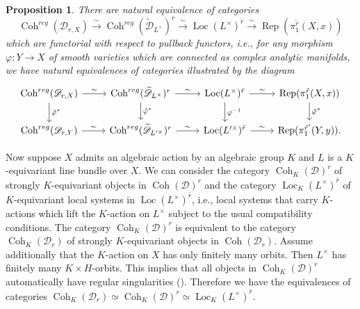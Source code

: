 \documentclass[12pt]{amsart}
\newcommand{\wt}{\widetilde}
\newcommand{\loc}{\operatorname{Loc}}
\newcommand{\coh}{\operatorname{Coh}}
\newtheorem{Prop}[Thm]{Proposition}
\theoremstyle{definition}
\numberwithin{equation}{section}
\begin{document}
\begin{Prop}\label{Prop:regular_local_systems}
	There are natural equivalence of categories \[ \coh^{reg}(\mathscr{D}_{r,X}) \xrightarrow{\sim} \coh^{reg}(\wt{\mathscr{D}}_{L^\times})^{r}  \xrightarrow{\sim} \loc(L^\times)^{\bar{r}}  \xrightarrow{\sim} \operatorname{Rep}(\pi^{\tilde{r}}_1(X, x)) \]
	which are functorial with respect to pullback functors, i.e., for any morphism $\varphi: Y \to X$ of smooth varieties which are connected as  complex analytic manifolds, we have natural equivalences of categories illustrated by the diagram
	\begin{equation}\label{diag:pi_functors}
		\begin{tikzcd}
			\coh^{reg}(\mathscr{D}_{r,X}) \arrow[r, "\sim"] \arrow[d, "\tilde{\varphi}^*"] & \coh^{reg}(\wt{\mathscr{D}}_{L^\times})^{r} \arrow[r, "\sim"] \arrow[d, "\tilde{\varphi}^*"]   & \loc(L^\times)^{\bar{r}}  \arrow[r, "\sim"]  \arrow[d, "\varphi^{-1}"]  & \operatorname{Rep}(\pi^{\tilde{r}}_1(X, x)) \arrow[d, "\tilde{\varphi}^*"] \\	
			\coh^{reg}(\mathscr{D}_{r,Y}) \arrow[r, "\sim"]   & \coh^{reg}(\wt{\mathscr{D}}_{L'^\times})^{r} \arrow[r, "\sim"]    & \loc(L'^\times)^{\bar{r}}  \arrow[r, "\sim"]   & \operatorname{Rep}(\pi^{\tilde{r}'}_1(Y, y)). 			
		\end{tikzcd}	
	\end{equation}
\end{Prop}

Now suppose $X$ admits an algebraic action by an algebraic group $K$ and $L$ is a $K$-equivariant line bundle over $X$. We can consider the category $\coh_K(\mathscr{D})^r$ of strongly $K$-equivariant objects in $\coh(\mathscr{D})^r$ and the category $\loc_{K}(L^\times)^{\bar{r}}$ of $K$-equivariant local systems in $\loc(L^\times)^{\bar{r}}$, i.e., local systems that carry $K$-actions which lift the $K$-action on $L^\times$
subject to the usual compatibility conditions. The category $\coh_K(\mathscr{D})^r$ is equivalent to the category $\coh_K(\mathscr{D}_r)$ of strongly $K$-equivariant objects in $\coh(\mathscr{D}_r)$.  Assume additionally that the $K$-action on $X$ has only finitely many orbits. Then $L^\times$ has finitely many $K \times H$-orbits. This implies that all objects in $\coh_K(\mathscr{D})^r$ automatically have regular singularities (\cite[Theorem 11.6.1]{Hotta}). Therefore we have the equivalences of categories $\coh_K(\mathscr{D}_r) \simeq \coh_K(\mathscr{D})^r \simeq  \loc_{K}(L^\times)^{\bar{r}}$.
\end{document}
